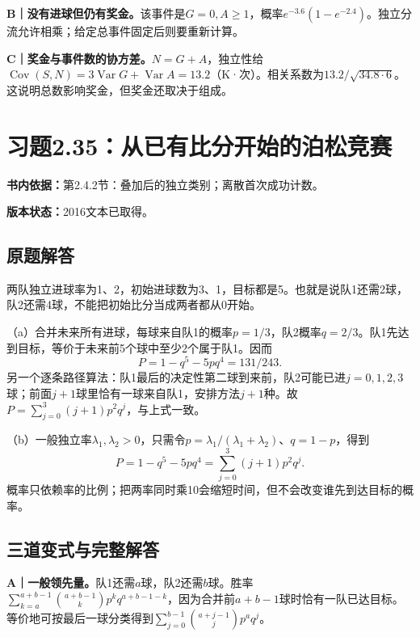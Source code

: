 \documentclass[
  11pt,
  a4paper,
  UTF8,fontset=fandol]{ctexart}
\let\OldSection\section
\renewcommand{\section}{\Needspace{7\baselineskip}\OldSection}
\let\OldSubsection\subsection
\renewcommand{\subsection}{\Needspace{5\baselineskip}\OldSubsection}
\begin{document}
\textbf{B｜没有进球但仍有奖金。}该事件是\(G=0,A\ge1\)，概率\(e^{-3.6}(1-e^{-2.4})\)。独立分流允许相乘；给定总事件固定后则要重新计算。

\textbf{C｜奖金与事件数的协方差。}\(N=G+A\)，独立性给\(\operatorname{Cov}(S,N)=3\operatorname{Var}G+\operatorname{Var}A=13.2\)（K·次）。相关系数为\(13.2/\sqrt{34.8\cdot6}\)。这说明总数影响奖金，但奖金还取决于组成。

\newpage

\section{习题2.35：从已有比分开始的泊松竞赛}\label{ux4e60ux98982.35ux4eceux5df2ux6709ux6bd4ux5206ux5f00ux59cbux7684ux6ccaux677eux7adeux8d5b}

\textbf{书内依据：}第2.4.2节：叠加后的独立类别；离散首次成功计数。

\textbf{版本状态：}2016文本已取得。

\subsection{原题解答}\label{ux539fux9898ux89e3ux7b54-34}

两队独立进球率为1、2，初始进球数为3、1，目标都是5。也就是说队1还需2球，队2还需4球，不能把初始比分当成两者都从0开始。

（a）合并未来所有进球，每球来自队1的概率\(p=1/3\)，队2概率\(q=2/3\)。队1先达到目标，等价于未来前5个球中至少2个属于队1。因而
\[P=1-q^5-5pq^4=\boxed{131/243}.\]
另一个逐条路径算法：队1最后的决定性第二球到来前，队2可能已进\(j=0,1,2,3\)球；前面\(j+1\)球里恰有一球来自队1，安排方法\(j+1\)种。故\(P=\sum_{j=0}^3(j+1)p^2q^j\)，与上式一致。

（b）一般独立率\(\lambda_1,\lambda_2>0\)，只需令\(p=\lambda_1/(\lambda_1+\lambda_2)\)、\(q=1-p\)，得到
\[\boxed{P=1-q^5-5pq^4=\sum_{j=0}^3(j+1)p^2q^j.}\]
概率只依赖率的比例；把两率同时乘10会缩短时间，但不会改变谁先到达目标的概率。

\subsection{三道变式与完整解答}\label{ux4e09ux9053ux53d8ux5f0fux4e0eux5b8cux6574ux89e3ux7b54-34}

\textbf{A｜一般领先量。}队1还需\(a\)球，队2还需\(b\)球。胜率\(\sum_{k=a}^{a+b-1}\binom{a+b-1}{k}p^kq^{a+b-1-k}\)，因为合并前\(a+b-1\)球时恰有一队已达目标。等价地可按最后一球分类得到\(\sum_{j=0}^{b-1}\binom{a+j-1}{j}p^aq^j\)。
\end{document}
